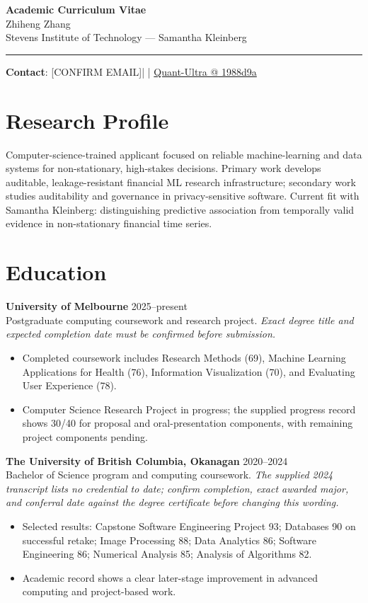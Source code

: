 \documentclass[11pt]{article}
\makeatletter
\newcommand{\ApplicantName}{Zhiheng Zhang}
\newcommand{\ApplicantEmail}{[CONFIRM EMAIL]}
\newcommand{\ApplicantPhone}{[CONFIRM PHONE]}
\newcommand{\ApplicantGitHub}{\href{https://github.com/zhiheng-zhang-Mera/Quant-Ultra/tree/1988d9a8530da91a8158de864d098ea869098923}{Quant-Ultra @ 1988d9a}}
\makeatother
\begin{document}
\begin{center}
{\LARGE\bfseries Academic Curriculum Vitae}\\[0.25em]
{\large \ApplicantName}\\
Stevens Institute of Technology --- Samantha Kleinberg
\end{center}
\vspace{0.35em}\hrule\vspace{0.65em}

\textbf{Contact}: \ApplicantEmail\quad | \quad \ApplicantPhone\quad | \quad \ApplicantGitHub

\section*{Research Profile}
Computer-science-trained applicant focused on reliable machine-learning and data systems for non-stationary, high-stakes decisions. Primary work develops auditable, leakage-resistant financial ML research infrastructure; secondary work studies auditability and governance in privacy-sensitive software. Current fit with Samantha Kleinberg: distinguishing predictive association from temporally valid evidence in non-stationary financial time series.

\section*{Education}
\textbf{University of Melbourne} \hfill 2025--present\\
Postgraduate computing coursework and research project. \textit{Exact degree title and expected completion date must be confirmed before submission.}
\begin{itemize}
\item Completed coursework includes Research Methods (69), Machine Learning Applications for Health (76), Information Visualization (70), and Evaluating User Experience (78).
\item Computer Science Research Project in progress; the supplied progress record shows 30/40 for proposal and oral-presentation components, with remaining project components pending.
\end{itemize}

\textbf{The University of British Columbia, Okanagan} \hfill 2020--2024\\
Bachelor of Science program and computing coursework. \textit{The supplied 2024 transcript lists no credential to date; confirm completion, exact awarded major, and conferral date against the degree certificate before changing this wording.}
\begin{itemize}
\item Selected results: Capstone Software Engineering Project 93; Databases 90 on successful retake; Image Processing 88; Data Analytics 86; Software Engineering 86; Numerical Analysis 85; Analysis of Algorithms 82.
\item Academic record shows a clear later-stage improvement in advanced computing and project-based work.
\end{itemize}
\end{document}
